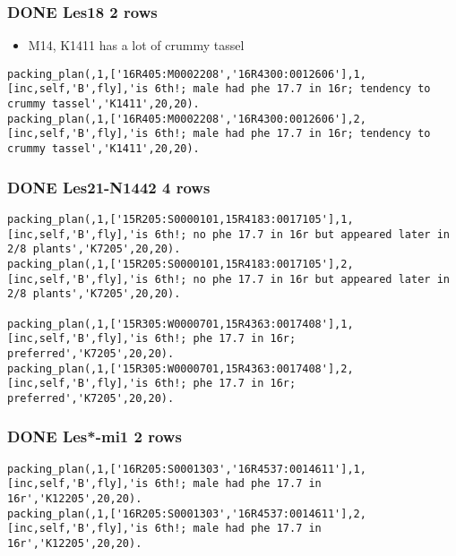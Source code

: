 \documentclass[11pt]{article}
\begin{document}
\subsubsection{{\bfseries\sffamily DONE} Les18 2 rows}
\label{sec-4-1-8}

\begin{itemize}
\item M14, K1411 has a lot of crummy tassel
\end{itemize}

\begin{verbatim}
packing_plan(,1,['16R405:M0002208','16R4300:0012606'],1,[inc,self,'B',fly],'is 6th!; male had phe 17.7 in 16r; tendency to crummy tassel','K1411',20,20).
packing_plan(,1,['16R405:M0002208','16R4300:0012606'],2,[inc,self,'B',fly],'is 6th!; male had phe 17.7 in 16r; tendency to crummy tassel','K1411',20,20).
\end{verbatim}


\subsubsection{{\bfseries\sffamily DONE} Les21-N1442  4 rows}
\label{sec-4-1-9}

\begin{verbatim}
packing_plan(,1,['15R205:S0000101,15R4183:0017105'],1,[inc,self,'B',fly],'is 6th!; no phe 17.7 in 16r but appeared later in 2/8 plants','K7205',20,20).
packing_plan(,1,['15R205:S0000101,15R4183:0017105'],2,[inc,self,'B',fly],'is 6th!; no phe 17.7 in 16r but appeared later in 2/8 plants','K7205',20,20).

packing_plan(,1,['15R305:W0000701,15R4363:0017408'],1,[inc,self,'B',fly],'is 6th!; phe 17.7 in 16r; preferred','K7205',20,20).
packing_plan(,1,['15R305:W0000701,15R4363:0017408'],2,[inc,self,'B',fly],'is 6th!; phe 17.7 in 16r; preferred','K7205',20,20).
\end{verbatim}


\subsubsection{{\bfseries\sffamily DONE} Les*-mi1     2 rows}
\label{sec-4-1-10}

\begin{verbatim}
packing_plan(,1,['16R205:S0001303','16R4537:0014611'],1,[inc,self,'B',fly],'is 6th!; male had phe 17.7 in 16r','K12205',20,20).
packing_plan(,1,['16R205:S0001303','16R4537:0014611'],2,[inc,self,'B',fly],'is 6th!; male had phe 17.7 in 16r','K12205',20,20).
\end{verbatim}
\end{document}
